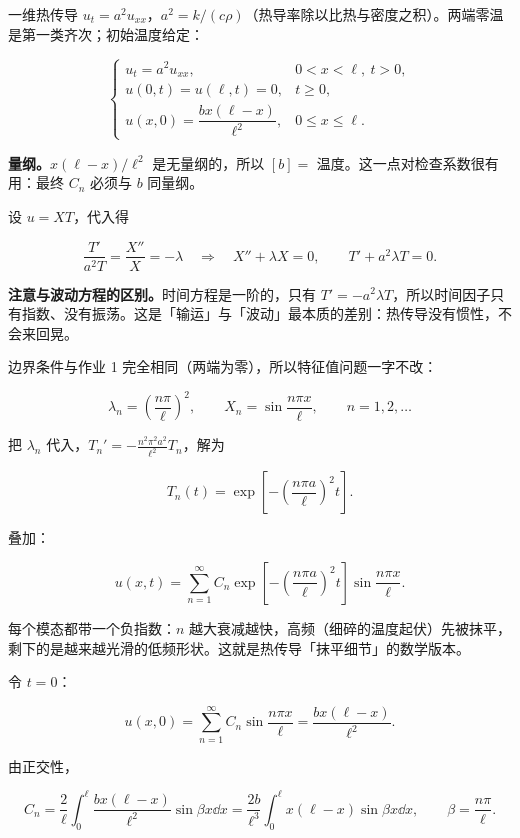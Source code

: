 
一维热传导 $u_t=a^2u_{xx}$，$a^2=k/(c\rho)$（热导率除以比热与密度之积）。两端零温是第一类齐次；初始温度给定：

\[
\begin{cases}
u_t=a^2u_{xx}, & 0<x<\ell,\ t>0,\\[2pt]
u(0,t)=u(\ell,t)=0, & t\ge0,\\[2pt]
u(x,0)=\dfrac{bx(\ell-x)}{\ell^2}, & 0\le x\le\ell .
\end{cases}
\]

\textbf{量纲。}$x(\ell-x)/\ell^2$ 是无量纲的，所以 $[b]=$ 温度。这一点对检查系数很有用：最终 $C_n$ 必须与 $b$ 同量纲。


设 $u=XT$，代入得

\[
\frac{T'}{a^2T}=\frac{X''}{X}=-\lambda
\quad\Longrightarrow\quad
X''+\lambda X=0,\qquad T'+a^2\lambda T=0 .
\]

\textbf{注意与波动方程的区别。}时间方程是一阶的，只有 $T'=-a^2\lambda T$，所以时间因子只有指数、没有振荡。这是「输运」与「波动」最本质的差别：热传导没有惯性，不会来回晃。

边界条件与作业 1 完全相同（两端为零），所以特征值问题一字不改：

\[
\lambda_n=\left(\frac{n\pi}{\ell}\right)^2,
\qquad
X_n=\sin\frac{n\pi x}{\ell},
\qquad n=1,2,\dots
\]


把 $\lambda_n$ 代入，$T_n'=-\frac{n^2\pi^2a^2}{\ell^2}T_n$，解为

\[
T_n(t)=\exp\left[-\left(\frac{n\pi a}{\ell}\right)^2t\right].
\]

叠加：

\[
u(x,t)=\sum_{n=1}^{\infty}C_n\exp\left[-\left(\frac{n\pi a}{\ell}\right)^2t\right]\sin\frac{n\pi x}{\ell}.
\]

每个模态都带一个负指数：$n$ 越大衰减越快，高频（细碎的温度起伏）先被抹平，剩下的是越来越光滑的低频形状。这就是热传导「抹平细节」的数学版本。


令 $t=0$：

\[
u(x,0)=\sum_{n=1}^{\infty}C_n\sin\frac{n\pi x}{\ell}=\frac{bx(\ell-x)}{\ell^2}.
\]

由正交性，

\[
C_n=\frac{2}{\ell}\int_0^{\ell}\frac{bx(\ell-x)}{\ell^2}\sin\beta x\dd x
=\frac{2b}{\ell^3}\int_0^{\ell}x(\ell-x)\sin\beta x\dd x,
\qquad \beta=\frac{n\pi}{\ell}.
\]

